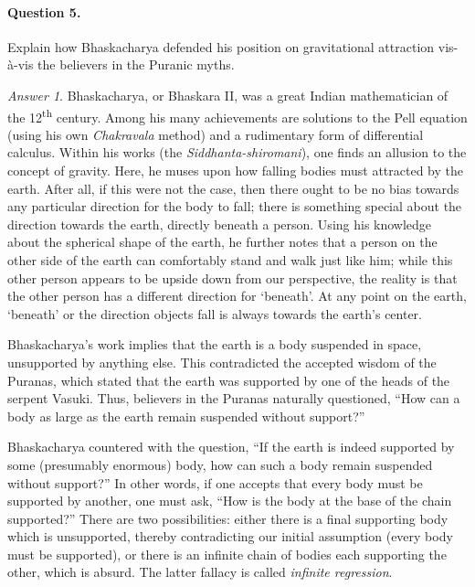 \documentclass[11pt]{article}
\theoremstyle{remark}
\newtheorem*{answer}{Answer}
\begin{document}
    \paragraph{Question 5.} Explain how Bhaskacharya defended his position on
    gravitational attraction vis-\`a-vis the believers in the Puranic myths.
    \begin{answer}
        Bhaskacharya, or Bhaskara II, was a great Indian mathematician of the
        12\textsuperscript{th} century. Among his many achievements are solutions to
        the Pell equation (using his own \emph{Chakravala} method) and a rudimentary
        form of differential calculus. Within his works (the
        \emph{Siddhanta-shiromani}), one finds an allusion to the concept of gravity.
        Here, he muses upon how falling bodies must attracted by the earth. After
        all, if this were not the case, then there ought to be no bias towards any
        particular direction for the body to fall; there is something special about
        the direction towards the earth, directly beneath a person. Using his
        knowledge about the spherical shape of the earth, he further notes that a
        person on the other side of the earth can comfortably stand and walk just
        like him; while this other person appears to be upside down from our
        perspective, the reality is that the other person has a different direction
        for `beneath'. At any point on the earth, `beneath' or the direction objects
        fall is always towards the earth's center.

        Bhaskacharya's work implies that the earth is a body suspended in space,
        unsupported by anything else. This contradicted the accepted wisdom of the
        Puranas, which stated that the earth was supported by one of the heads of the
        serpent Vasuki. Thus, believers in the Puranas naturally questioned, ``How
        can a body as large as the earth remain suspended without support?''

        Bhaskacharya countered with the question, ``If the earth is indeed supported
        by some (presumably enormous) body, how can such a body remain suspended
        without support?'' In other words, if one accepts that every body must be
        supported by another, one must ask, ``How is the body at the base of the chain
        supported?'' There are two possibilities: either there is a final supporting
        body which is unsupported, thereby contradicting our initial assumption
        (every body must be supported), or there is an infinite chain of bodies each
        supporting the other, which is absurd. The latter fallacy is called
        \emph{infinite regression}.


\end{answer}
\end{document}
